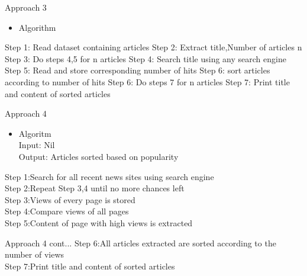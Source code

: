 \documentclass{beamer}
\begin{document}
	
	
	       
	
	\begin{frame}{Approach 3}
		\begin{itemize}
			\item \Large Algorithm
		\end{itemize}
		\Large{Step 1: Read dataset containing articles \newline
		Step 2: Extract title,Number of articles n \newline
		Step 3: Do steps 4,5 for n articles \newline
		Step 4: Search title using any search engine \newline
		Step 5: Read and store corresponding number of hits \newline
		Step 6: sort articles according to number of hits \newline
		Step 6: Do steps 7 for n articles \newline
		Step 7: Print title and content of sorted articles}
		
	\end{frame}
	\begin{frame}{Approach 4}
		   \begin{itemize}
        	\item \Large Algoritm\\
        	\footnotesize
        	\Large{Input: Nil\\
        	Output: Articles sorted based on popularity \\  }
   	   \end{itemize}	
           \Large{ Step 1:Search for all recent news sites using search engine\\
            Step 2:Repeat Step 3,4 until no more chances left\\
            Step 3:Views of every page is stored\\
            Step 4:Compare views of all pages\\
            Step 5:Content of page with high views is extracted\\
            }


	\end{frame}
	\begin{frame}{Approach 4 cont...}
	    \Large{
            Step 6:All articles extracted are sorted according to the number of views\\
            Step 7:Print title and content of sorted articles\\} 
	\end{frame}
\end{document}
